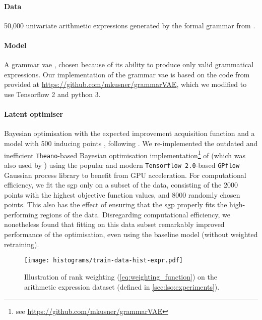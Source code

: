 \paragraph{Data} 50,000 univariate arithmetic expressions generated by the formal grammar from \citet{kusner_grammar_2017}.
\paragraph{Model} A grammar \gls{vae} \citet{kusner_grammar_2017},
chosen because of its ability to produce only valid grammatical expressions.
Our implementation of the grammar \gls{vae} is based on the code from 
\citep{kusner_grammar_2017} provided at \url{https://github.com/mkusner/grammarVAE},
which we modified to use Tensorflow 2 \citep{abadi2016tensorflow} and python 3.
\paragraph{Latent optimiser} Bayesian optimisation with the expected improvement acquisition function \citep{jones1998efficient}
and a  model with 500 inducing points \citep{titsias2009variational},
following \citet{kusner_grammar_2017}.
We re-implemented the outdated and inefficient \texttt{Theano}-based Bayesian optimisation
implementation\footnote{see \url{https://github.com/mkusner/grammarVAE}}
of \citet{kusner_grammar_2017} (which was also used by \citep{jin_junction_2019})
using the popular and modern \texttt{Tensorflow 2.0}-based \texttt{GPflow} Gaussian process library
\citep{de2017gpflow} to benefit from GPU acceleration.
For computational efficiency, we fit the \gls{sgp} only on a subset of the data, consisting of the 2000 points
with the highest objective function values,
and 8000 randomly chosen points.
This also has the effect of ensuring that the \gls{sgp} properly fits the high-performing regions of the data.
Disregarding computational efficiency, we nonetheless found that fitting on this data subset remarkably improved performance
of the optimisation, even using the baseline model (without weighted retraining).

\begin{figure}[ht]
    \centering
    \texttt{[image: histograms/train-data-hist-expr.pdf]}
    \caption[Rank weighting on the arithmetic expression dataset.]{
    Illustration of rank weighting (\cref{eq:weighting_function})
    on the arithmetic expression dataset (defined in \cref{sec:lso:experiments}).
    }
    \label{fig:weighting_equation}
\end{figure}

